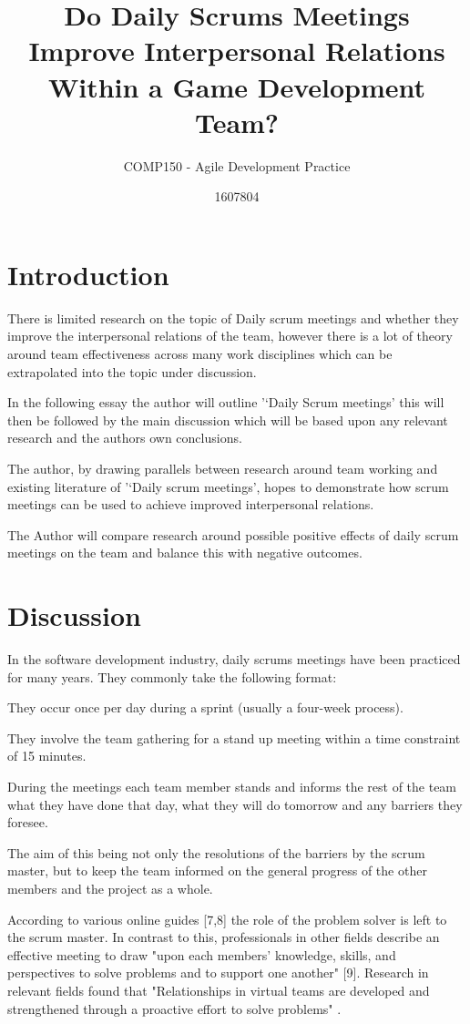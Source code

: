 \documentclass{scrartcl}
\title{Do Daily Scrums Meetings Improve Interpersonal Relations Within a Game Development Team?}
\subtitle{COMP150 - Agile Development Practice}
\author{1607804}
\begin{document}
\maketitle


\section{Introduction}
There is limited research on the topic of Daily scrum meetings and whether they improve the interpersonal relations of the team, however there is a lot of theory around team effectiveness across many work disciplines which can be extrapolated into the topic under discussion. 

In the following essay the author will outline '‘Daily Scrum meetings' this will then be followed by the main discussion which will be based upon any relevant research and the authors own conclusions. 

The author, by drawing parallels between research around team working and existing literature of '‘Daily scrum meetings', hopes to demonstrate how scrum meetings can be used to achieve improved interpersonal relations. 

The Author will compare research around possible positive effects of daily scrum meetings on the team and balance this with negative outcomes. 


\section{Discussion}
In the software development industry, daily scrums meetings have been practiced for many years. They commonly take the following format:

They occur once per day during a sprint (usually a four-week process). 

They involve the team gathering for a stand up meeting within a time constraint of 15 minutes. 

During the meetings each team member stands and informs the rest of the team what they have done that day, what they will do tomorrow and any barriers they foresee.

The aim of this being not only the resolutions of the barriers by the scrum master, but to keep the team informed on the general progress of the other members and the project as a whole. 

According to various online guides [7,8] the role of the problem solver is left to the scrum master. In contrast to this, professionals in other fields describe an effective meeting to draw "upon each members' knowledge, skills, and perspectives to solve problems and to support one another" [9]. Research in relevant fields found that "Relationships in virtual teams are developed and strengthened through a proactive effort to solve problems" \cite[p. x]{tavvcar2005skills}. 
\end{document}
